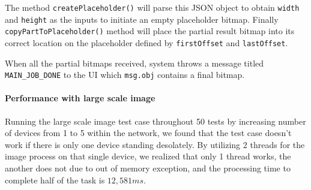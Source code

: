 \documentclass[conference]{IEEEtran}
\begin{document}
\noindent {}

The method \texttt{createPlaceholder()} will parse this JSON object to obtain \texttt{width} and \texttt{height} as the inputs to initiate an empty placeholder bitmap. Finally \texttt{copyPartToPlaceholder()} method will place the partial result bitmap into its correct location on the placeholder defined by \texttt{firstOffset} and \texttt{lastOffset}.\\

\noindent {}

When all the partial bitmaps received, system throws a message titled \texttt{MAIN\_JOB\_DONE} to the UI which \texttt{msg.obj} contains a final bitmap.

\paragraph{Performance with large scale image}

Running the large scale image test case throughout 50 tests by increasing number of devices from 1 to 5 within the network, we found that the test case doesn't work if there is only one device standing desolately. By utilizing 2 threads for the image process on that single device, we realized that only 1 thread works, the another does not due to out of memory exception, and the processing time to complete half of the task is $12,581ms$. 
\end{document}
